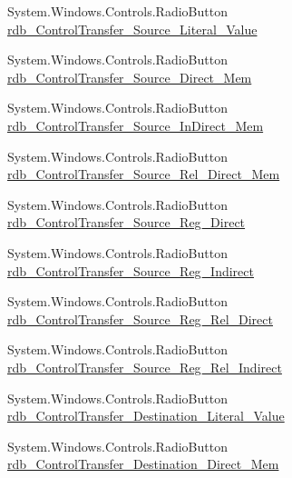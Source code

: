 \begin{DoxyCompactItemize}
\item 
System.\+Windows.\+Controls.\+Radio\+Button \hyperlink{class_c_p_u___o_s___simulator_1_1_instructions_window_a0d2a2a1d41e64faf466f77c2b5e1c5fa}{rdb\+\_\+\+Control\+Transfer\+\_\+\+Source\+\_\+\+Literal\+\_\+\+Value}
\item 
System.\+Windows.\+Controls.\+Radio\+Button \hyperlink{class_c_p_u___o_s___simulator_1_1_instructions_window_adb6bd56847babb5c64035c1262e4f8cd}{rdb\+\_\+\+Control\+Transfer\+\_\+\+Source\+\_\+\+Direct\+\_\+\+Mem}
\item 
System.\+Windows.\+Controls.\+Radio\+Button \hyperlink{class_c_p_u___o_s___simulator_1_1_instructions_window_a99653f1b57dd1f0a1b78f76b71489fd4}{rdb\+\_\+\+Control\+Transfer\+\_\+\+Source\+\_\+\+In\+Direct\+\_\+\+Mem}
\item 
System.\+Windows.\+Controls.\+Radio\+Button \hyperlink{class_c_p_u___o_s___simulator_1_1_instructions_window_a53654904fca3aa6110ff70219da5eadf}{rdb\+\_\+\+Control\+Transfer\+\_\+\+Source\+\_\+\+Rel\+\_\+\+Direct\+\_\+\+Mem}
\item 
System.\+Windows.\+Controls.\+Radio\+Button \hyperlink{class_c_p_u___o_s___simulator_1_1_instructions_window_a93812cd2e752c208aacafd1617724c51}{rdb\+\_\+\+Control\+Transfer\+\_\+\+Source\+\_\+\+Reg\+\_\+\+Direct}
\item 
System.\+Windows.\+Controls.\+Radio\+Button \hyperlink{class_c_p_u___o_s___simulator_1_1_instructions_window_a5a093e349636a1c4a8bb8ca7e262fa3b}{rdb\+\_\+\+Control\+Transfer\+\_\+\+Source\+\_\+\+Reg\+\_\+\+Indirect}
\item 
System.\+Windows.\+Controls.\+Radio\+Button \hyperlink{class_c_p_u___o_s___simulator_1_1_instructions_window_a614e7c7f4828a1d224b45144c53378d9}{rdb\+\_\+\+Control\+Transfer\+\_\+\+Source\+\_\+\+Reg\+\_\+\+Rel\+\_\+\+Direct}
\item 
System.\+Windows.\+Controls.\+Radio\+Button \hyperlink{class_c_p_u___o_s___simulator_1_1_instructions_window_a46c72ab173917ccf86384d3d725a99d4}{rdb\+\_\+\+Control\+Transfer\+\_\+\+Source\+\_\+\+Reg\+\_\+\+Rel\+\_\+\+Indirect}
\item 
System.\+Windows.\+Controls.\+Radio\+Button \hyperlink{class_c_p_u___o_s___simulator_1_1_instructions_window_aedb1c7493ffb6c31a696cd19db7a9958}{rdb\+\_\+\+Control\+Transfer\+\_\+\+Destination\+\_\+\+Literal\+\_\+\+Value}
\item 
System.\+Windows.\+Controls.\+Radio\+Button \hyperlink{class_c_p_u___o_s___simulator_1_1_instructions_window_a2954cd90aee28f607d0b1ed35faeda96}{rdb\+\_\+\+Control\+Transfer\+\_\+\+Destination\+\_\+\+Direct\+\_\+\+Mem}

\end{DoxyCompactItemize}
